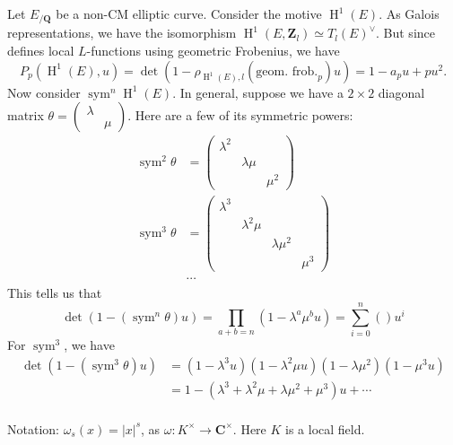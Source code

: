 \documentclass{article}
\DeclareMathOperator{\h}{H}
\DeclareMathOperator{\sym}{sym}
\newcommand{\bC}{\mathbf{C}}
\newcommand{\bQ}{\mathbf{Q}}
\newcommand{\bZ}{\mathbf{Z}}
\begin{document}
Let $E_{/\bQ}$ be a non-CM elliptic curve. Consider the motive $\h^1(E)$. As 
Galois representations, we have the isomorphism 
$\h^1(E,\bZ_l)\simeq T_l(E)^\vee$. But since \cite{fontaine-perrin-riou-1994} 
defines local $L$-functions using geometric Frobenius, we have 
\[
	P_p(\h^1(E),u) = \det(1-\rho_{\h^1(E),l}(\text{geom.~frob.}_p)u) = 1-a_p u + p u^2 .
\]
Now consider $\sym^n \h^1(E)$. In general, suppose we have a $2\times 2$ 
diagonal matrix $\theta = \begin{pmatrix} \lambda \\ & \mu \end{pmatrix}$. 
Here are a few of its symmetric powers:
\begin{align*}
	\sym^2 \theta &= \begin{pmatrix} \lambda^2 \\ & \lambda\mu \\ & & \mu^2 \end{pmatrix} \\
	\sym^3 \theta &= \begin{pmatrix} \lambda^3 \\ & \lambda^2 \mu \\ & & \lambda \mu^2 \\ & & & \mu^3 \end{pmatrix} \\
	&\cdots
\end{align*}
This tells us that 
\[
	\det(1-(\sym^n \theta) u) = \prod_{a+b=n} (1-\lambda^a \mu^b u) = \sum_{i=0}^n () u^i
\]
For $\sym^3$, we have 
\begin{align*}
	\det(1-(\sym^3\theta)u) 
		&= (1-\lambda^3 u)(1-\lambda^2 \mu u)(1-\lambda\mu^2)(1-\mu^3 u) \\
		&= 1 - (\lambda^3 + \lambda^2\mu + \lambda\mu^2 + \mu^3)u + \cdots \\
\end{align*}

Notation: $\omega_s(x) = |x|^s$, as $\omega\colon K^\times\to \bC^\times$. Here 
$K$ is a local field. 





\printbibliography
\end{document}
